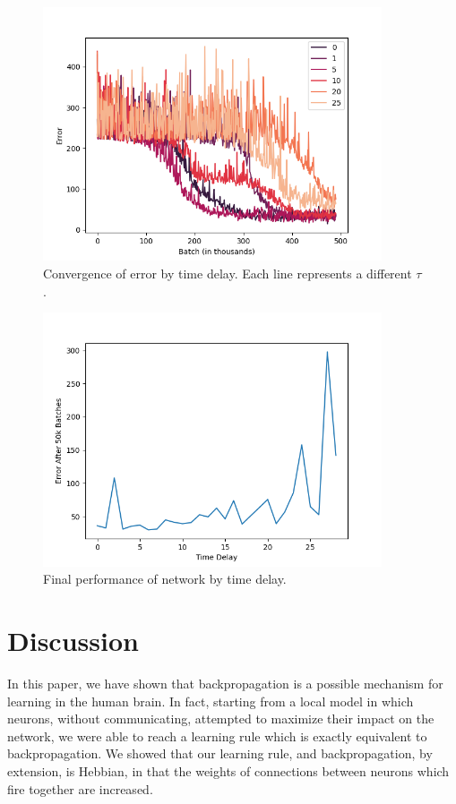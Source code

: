 \documentclass[12pt]{article}
\begin{document}
\begin{figure}
	\includegraphics[width=10cm]{error_by_tau_figure}
	\centering
	\caption{Convergence of error by time delay. Each line represents a different $\tau$.}
	\label{fig:tau_convergence_speed}
\end{figure}

\begin{figure}
	\includegraphics[width=10cm]{final_performance_by_tau}\centering
	\caption{Final performance of network by time delay.}
	\label{fig:tau_final_performance}
\end{figure}

\section{Discussion}
In this paper, we have shown that backpropagation is a possible mechanism for learning in the human brain. In fact, starting from a local model in which neurons, without communicating, attempted to maximize their impact on the network, we were able to reach a learning rule which is exactly equivalent to backpropagation. We showed that our learning rule, and backpropagation, by extension, is Hebbian, in that the weights of connections between neurons which fire together are increased. 
\end{document}
